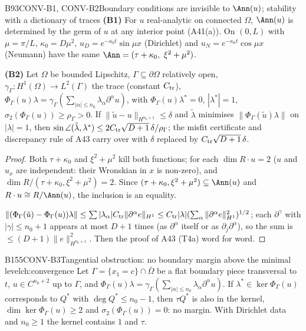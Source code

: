\begin{dimcard}{B93}{CONV-B1, CONV-B2}{Boundary conditions are invisible to $\Ann(u)$; stability with a dictionary of traces}{\proved}{}
\textbf{(B1)} For $u$ real-analytic on connected $\Omega$, $\Ann(u)$ is determined by the germ of $u$ at any interior point (A41(a)). On $(0,L)$ with $\mu=\pi/L$, $\kappa_0=D\mu^2$, $u_D=e^{-\kappa_0t}\sin\mu x$ (Dirichlet) and $u_N=e^{-\kappa_0t}\cos\mu x$ (Neumann) have the same $\Ann=(\tau+\kappa_0,\ \xi^2+\mu^2)$.

\textbf{(B2)} Let $\Omega$ be bounded Lipschitz, $\Gamma\subseteq\partial\Omega$ relatively open, $\gamma_\Gamma:H^1(\Omega)\to L^2(\Gamma)$ the trace (constant $C_{\rm tr}$), $\Phi_\Gamma(u)\lambda=\gamma_\Gamma(\sum_{|\alpha|\le n_0}\lambda_\alpha\partial^\alpha u)$, with $\Phi_\Gamma(u)\lambda^*=0$, $|\lambda^*|=1$, $\sigma_2(\Phi_\Gamma(u))\ge\rho_\Gamma>0$. If $\|\tilde u-u\|_{H^{n_0+1}}\le\delta$ and $\tilde\lambda$ minimises $\|\Phi_\Gamma(\tilde u)\lambda\|$ on $|\lambda|=1$, then $\sin\angle(\tilde\lambda,\lambda^*)\le2C_{\rm tr}\sqrt{D+1}\,\delta/\rho_\Gamma$; the misfit certificate and discrepancy rule of A43 carry over with $\delta$ replaced by $C_{\rm tr}\sqrt{D+1}\,\delta$.
\end{dimcard}

\begin{proof}
Both $\tau+\kappa_0$ and $\xi^2+\mu^2$ kill both functions; for each $\dim R\cdot u=2$ ($u$ and $u_x$ are independent: their Wronskian in $x$ is non-zero), and $\dim R/(\tau+\kappa_0,\xi^2+\mu^2)=2$. Since $(\tau+\kappa_0,\xi^2+\mu^2)\subseteq\Ann(u)$ and $R\cdot u\cong R/\Ann(u)$, the inclusion is an equality.

$\|(\Phi_\Gamma(\tilde u)-\Phi_\Gamma(u))\lambda\|\le\sum|\lambda_\alpha|C_{\rm tr}\|\partial^\alpha e\|_{H^1}\le C_{\rm tr}|\lambda|(\sum_\alpha\|\partial^\alpha e\|_{H^1}^2)^{1/2}$; each $\partial^\gamma$ with $|\gamma|\le n_0+1$ appears at most $D+1$ times (as $\partial^\alpha$ itself or as $\partial_j\partial^\alpha$), so the sum is $\le(D+1)\|e\|^2_{H^{n_0+1}}$. Then the proof of A43 (T4a) word for word.

\end{proof}

\begin{dimcard}{B155}{CONV-B3}{Tangential obstruction: no boundary margin above the minimal level}{\pw}{ch:convergence}
Let $\Gamma=\{x_1=c\}\cap\bar\Omega$ be a flat boundary piece transversal to $t$, $u\in C^{n_0+2}$ up to $\Gamma$, and $\Phi_\Gamma(u)\lambda=\gamma_\Gamma(\sum_{|\alpha|\le n_0}\lambda_\alpha\partial^\alpha u)$. If $\lambda^*\in\ker\Phi_\Gamma(u)$ corresponds to $Q^*$ with $\deg Q^*\le n_0-1$, then $\tau Q^*$ is also in the kernel, $\dim\ker\Phi_\Gamma(u)\ge2$ and $\sigma_2(\Phi_\Gamma(u))=0$: no margin. With Dirichlet data and $n_0\ge1$ the kernel contains $1$ and $\tau$.
\end{dimcard}

